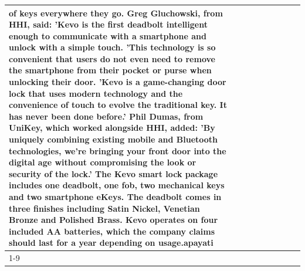 \begin{table}[H]
\begin{tabular}{lllrlllll}
of keys everywhere they go. Greg Gluchowski, from HHI, said: 'Kevo is the first deadbolt intelligent enough to communicate with a smartphone and unlock with a simple touch. 'This technology is so convenient that users do not even need to remove the smartphone from their pocket or purse when unlocking their door. 'Kevo is a game-changing door lock that uses modern technology and the convenience of touch to evolve the traditional key. It has never been done before.' Phil Dumas, from UniKey, which worked alongside HHI, added: 'By uniquely combining existing mobile and Bluetooth technologies, we’re bringing your front door into the digital age without compromising the look or security of the lock.' The Kevo smart lock package includes one deadbolt, one fob, two mechanical keys and two smartphone eKeys. The deadbolt comes in three finishes including Satin Nickel, Venetian Bronze and Polished Brass. Kevo operates on four included AA batteries, which the company claims should last for a year depending on usage.apayati \\
\cline{1-9}

\end{tabular}
\end{table}
